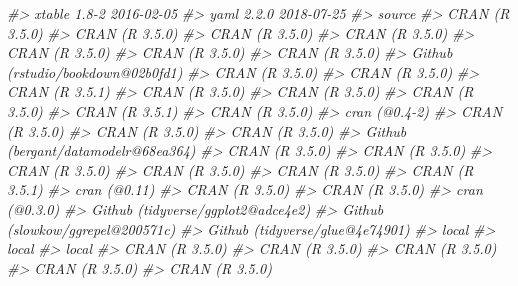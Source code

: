 \documentclass[]{book}
\newenvironment{Shaded}{\begin{snugshade}}{\end{snugshade}}
\newcommand{\CommentTok}[1]{\textcolor[rgb]{0.56,0.35,0.01}{\textit{#1}}}
\theoremstyle{plain}
\theoremstyle{remark}
\begin{document}
\begin{Shaded}
\begin{Highlighting}[]
\CommentTok{#>  xtable           1.8-2      2016-02-05}
\CommentTok{#>  yaml             2.2.0      2018-07-25}
\CommentTok{#>  source                                   }
\CommentTok{#>  CRAN (R 3.5.0)                           }
\CommentTok{#>  CRAN (R 3.5.0)                           }
\CommentTok{#>  CRAN (R 3.5.0)                           }
\CommentTok{#>  CRAN (R 3.5.0)                           }
\CommentTok{#>  CRAN (R 3.5.0)                           }
\CommentTok{#>  CRAN (R 3.5.0)                           }
\CommentTok{#>  CRAN (R 3.5.0)                           }
\CommentTok{#>  Github (rstudio/bookdown@02b0fd1)        }
\CommentTok{#>  CRAN (R 3.5.0)                           }
\CommentTok{#>  CRAN (R 3.5.0)                           }
\CommentTok{#>  CRAN (R 3.5.1)                           }
\CommentTok{#>  CRAN (R 3.5.0)                           }
\CommentTok{#>  CRAN (R 3.5.0)                           }
\CommentTok{#>  CRAN (R 3.5.0)                           }
\CommentTok{#>  CRAN (R 3.5.1)                           }
\CommentTok{#>  CRAN (R 3.5.0)                           }
\CommentTok{#>  cran (@0.4-2)                            }
\CommentTok{#>  CRAN (R 3.5.0)                           }
\CommentTok{#>  CRAN (R 3.5.0)                           }
\CommentTok{#>  CRAN (R 3.5.0)                           }
\CommentTok{#>  Github (bergant/datamodelr@68ea364)      }
\CommentTok{#>  CRAN (R 3.5.0)                           }
\CommentTok{#>  CRAN (R 3.5.0)                           }
\CommentTok{#>  CRAN (R 3.5.0)                           }
\CommentTok{#>  CRAN (R 3.5.0)                           }
\CommentTok{#>  CRAN (R 3.5.0)                           }
\CommentTok{#>  CRAN (R 3.5.1)                           }
\CommentTok{#>  cran (@0.11)                             }
\CommentTok{#>  CRAN (R 3.5.0)                           }
\CommentTok{#>  CRAN (R 3.5.0)                           }
\CommentTok{#>  cran (@0.3.0)                            }
\CommentTok{#>  Github (tidyverse/ggplot2@adce4e2)       }
\CommentTok{#>  Github (slowkow/ggrepel@200571c)         }
\CommentTok{#>  Github (tidyverse/glue@4e74901)          }
\CommentTok{#>  local                                    }
\CommentTok{#>  local                                    }
\CommentTok{#>  local                                    }
\CommentTok{#>  CRAN (R 3.5.0)                           }
\CommentTok{#>  CRAN (R 3.5.0)                           }
\CommentTok{#>  CRAN (R 3.5.0)                           }
\CommentTok{#>  CRAN (R 3.5.0)                           }
\CommentTok{#>  CRAN (R 3.5.0)                           }

\end{Highlighting}
\end{Shaded}
\end{document}
